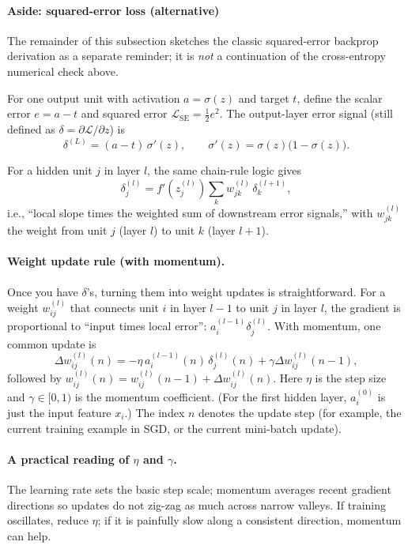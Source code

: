 \paragraph{Aside: squared-error loss (alternative)}

The remainder of this subsection sketches the classic squared-error backprop derivation as a separate reminder; it is \emph{not} a continuation of the cross\hyp{}entropy numerical check above.

For one output unit with activation \(a=\sigma(z)\) and target \(t\), define the scalar error \(e=a-t\) and squared error
\(\mathcal{L}_{\text{SE}}=\tfrac12 e^2\). The output-layer error signal (still defined as \(\delta=\partial\mathcal{L}/\partial z\)) is
\[
\delta^{(L)} = (a-t)\,\sigma'(z), \qquad \sigma'(z)=\sigma(z)\bigl(1-\sigma(z)\bigr).
\]

For a hidden unit \(j\) in layer \(l\), the same chain-rule logic gives
\[
\delta_j^{(l)} = f'(z_j^{(l)}) \sum_{k} w_{jk}^{(l)}\,\delta_k^{(l+1)},
\]
i.e., ``local slope times the weighted sum of downstream error signals,'' with \(w_{jk}^{(l)}\) the weight from unit \(j\) (layer \(l\)) to unit \(k\) (layer \(l+1\)).

\paragraph{Weight update rule (with momentum).}
Once you have \(\delta\)'s, turning them into weight updates is straightforward. For a weight \(w_{ij}^{(l)}\) that connects unit \(i\) in layer \(l-1\) to unit \(j\) in layer \(l\), the gradient is proportional to ``input times local error'': \(a_i^{(l-1)}\delta_j^{(l)}\). With momentum, one common update is
\begin{equation}
    \Delta w_{ij}^{(l)}(n) = -\eta \, a_i^{(l-1)}(n)\,\delta_j^{(l)}(n) + \gamma \Delta w_{ij}^{(l)}(n-1),
    \label{eq:weight_update}
\end{equation}
followed by \(w_{ij}^{(l)}(n)=w_{ij}^{(l)}(n-1)+\Delta w_{ij}^{(l)}(n)\). Here \(\eta\) is the step size and \(\gamma\in[0,1)\) is the momentum coefficient. (For the first hidden layer, \(a_i^{(0)}\) is just the input feature \(x_i\).)
The index \(n\) denotes the update step (for example, the current training example in SGD, or the current mini\hyp{}batch update).

\paragraph{A practical reading of \(\eta\) and \(\gamma\).}
The learning rate sets the basic step scale; momentum averages recent gradient directions so updates do not zig\hyp{}zag as much across narrow valleys. If training oscillates, reduce \(\eta\); if it is painfully slow along a consistent direction, momentum can help.

